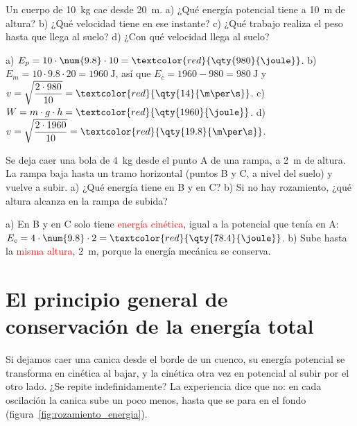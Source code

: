 \begin{exercise}
    Un cuerpo de \qty{10}{\kg} cae desde \qty{20}{\m}. a) ¿Qué energía potencial tiene a \qty{10}{\m} de altura? b) ¿Qué velocidad tiene en ese instante? c) ¿Qué trabajo realiza el peso hasta que llega al suelo? d) ¿Con qué velocidad llega al suelo?
    \begin{solu}
        a) \(E_p = 10 \cdot \num{9.8} \cdot 10 = \textcolor{red}{\qty{980}{\joule}}\).
        b) \(E_m = 10 \cdot \num{9.8} \cdot 20 = \qty{1960}{\joule}\), así que \(E_c = 1960 - 980 = \qty{980}{\joule}\) y \(v = \sqrt{\dfrac{2 \cdot 980}{10}} = \textcolor{red}{\qty{14}{\m\per\s}}\).
        c) \(W = m \cdot g \cdot h = \textcolor{red}{\qty{1960}{\joule}}\). d) \(v = \sqrt{\dfrac{2 \cdot 1960}{10}} = \textcolor{red}{\qty{19.8}{\m\per\s}}\).
    \end{solu}
\end{exercise}

\begin{exercise}
    Se deja caer una bola de \qty{4}{\kg} desde el punto A de una rampa, a \qty{2}{\m} de altura. La rampa baja hasta un tramo horizontal (puntos B y C, a nivel del suelo) y vuelve a subir. a) ¿Qué energía tiene en B y en C? b) Si no hay rozamiento, ¿qué altura alcanza en la rampa de subida?
    \begin{solu}
        a) En B y en C solo tiene \textcolor{red}{energía cinética}, igual a la potencial que tenía en A: \(E_c = 4 \cdot \num{9.8} \cdot 2 = \textcolor{red}{\qty{78.4}{\joule}}\).
        b) Sube hasta la \textcolor{red}{misma altura}, \qty{2}{\m}, porque la energía mecánica se conserva.
    \end{solu}
\end{exercise}

\section[Conservación de la energía total]{El principio general de conservación de la energía total}

Si dejamos caer una canica desde el borde de un cuenco, su energía potencial se transforma en cinética al bajar, y la cinética otra vez en potencial al subir por el otro lado. ¿Se repite indefinidamente? La experiencia dice que no: en cada oscilación la canica sube un poco menos, hasta que se para en el fondo (figura~\ref{fig:rozamiento_energia}).


